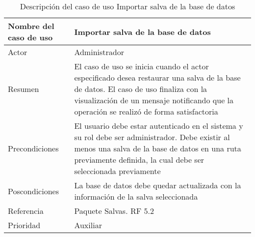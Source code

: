 \begin{table}[H]
	\sf
	\begin{supertabular}{|p{4.5cm}|p{12cm}|}
		\hline
		\textbf{Nombre del caso de uso}
		& \textbf{Importar salva de la base de datos} \\ \hline
		
		Actor
		& Administrador \\ \hline
		
		Resumen
		& El caso de uso se inicia cuando el actor especificado desea restaurar una salva de la base de datos. El caso de uso finaliza con la visualización de un mensaje notificando que la operación se realizó de forma satisfactoria \\ \hline
		
		Precondiciones
		& El usuario debe estar autenticado en el sistema y su rol debe ser administrador.
		Debe existir al menos una salva de la base de datos en una ruta previamente definida, la cual debe ser seleccionada previamente \\ \hline
		
		Poscondiciones
		& La base de datos debe quedar actualizada con la información de la salva seleccionada \\ \hline
		
		Referencia
		& Paquete Salvas. RF 5.2 \\ \hline
		
		Prioridad
		& Auxiliar \\		
		\hline
	\end{supertabular}
	\caption[Descripción del caso de uso Importar salva de la base de datos]{Descripción del caso de uso Importar salva de la base de datos}
	\label{table:CU_ImportBD}
\end{table}

